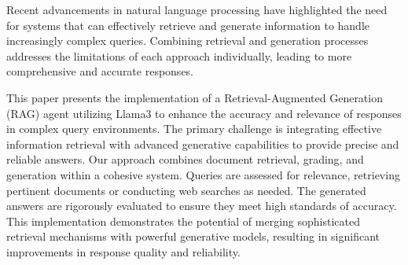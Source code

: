 Recent advancements in natural language processing have highlighted the need for systems that can effectively retrieve and generate information to handle increasingly complex queries. Combining retrieval and generation processes addresses the limitations of each approach individually, leading to more comprehensive and accurate responses.

\hfill

This paper presents the implementation of a Retrieval-Augmented Generation (RAG) agent utilizing Llama3 to enhance the accuracy and relevance of responses in complex query environments. The primary challenge is integrating effective information retrieval with advanced generative capabilities to provide precise and reliable answers. Our approach combines document retrieval, grading, and generation within a cohesive system. Queries are assessed for relevance, retrieving pertinent documents or conducting web searches as needed. The generated answers are rigorously evaluated to ensure they meet high standards of accuracy. This implementation demonstrates the potential of merging sophisticated retrieval mechanisms with powerful generative models, resulting in significant improvements in response quality and reliability.